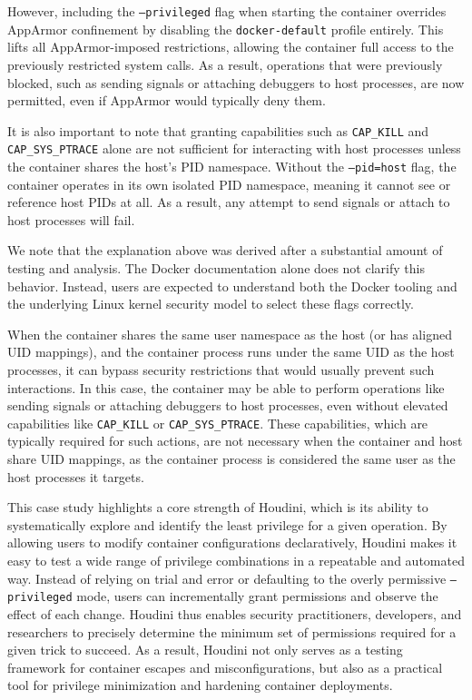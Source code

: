 \begin{doublespace}
However, including the \texttt{--privileged} flag when starting the container overrides AppArmor confinement by disabling the \texttt{docker-default} profile entirely. This lifts all AppArmor-imposed restrictions, allowing the container full access to the previously restricted system calls. As a result, operations that were previously blocked, such as sending signals or attaching debuggers to host processes, are now permitted, even if AppArmor would typically deny them.

It is also important to note that granting capabilities such as \texttt{CAP\_KILL} and \texttt{CAP\_SYS\_PTRACE} alone are not sufficient for interacting with host processes unless the container shares the host’s PID namespace. Without the \texttt{--pid=host} flag, the container operates in its own isolated PID namespace, meaning it cannot see or reference host PIDs at all. As a result, any attempt to send signals or attach to host processes will fail.

We note that the explanation above was derived after a substantial amount of testing and analysis. The Docker documentation alone does not clarify this behavior. Instead, users are expected to understand both the Docker tooling and the underlying Linux kernel security model to select these flags correctly. 

When the container shares the same user namespace as the host (or has aligned UID mappings), and the container process runs under the same UID as the host processes, it can bypass security restrictions that would usually prevent such interactions. In this case, the container may be able to perform operations like sending signals or attaching debuggers to host processes, even without elevated capabilities like \texttt{CAP\_KILL} or \texttt{CAP\_SYS\_PTRACE}. These capabilities, which are typically required for such actions, are not necessary when the container and host share UID mappings, as the container process is considered the same user as the host processes it targets.

This case study highlights a core strength of Houdini, which is its ability to systematically explore and identify the least privilege for a given operation. By allowing users to modify container configurations declaratively, Houdini makes it easy to test a wide range of privilege combinations in a repeatable and automated way. Instead of relying on trial and error or defaulting to the overly permissive \texttt{--privileged} mode, users can incrementally grant permissions and observe the effect of each change. Houdini thus enables security practitioners, developers, and researchers to precisely determine the minimum set of permissions required for a given trick to succeed. As a result, Houdini not only serves as a testing framework for container escapes and misconfigurations, but also as a practical tool for privilege minimization and hardening container deployments.


\end{doublespace}
